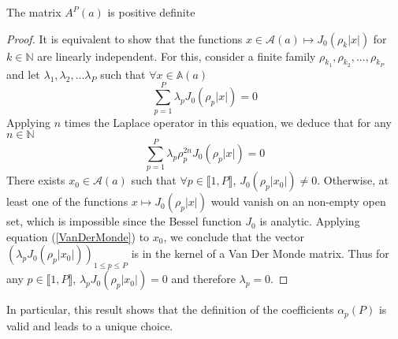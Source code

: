 \documentclass[11pt,a4paper]{article}
\begin{document}
\begin{Prop} The matrix $A^P(a)$ is positive definite
\label{AdefPos}
\begin{proof}
It is equivalent to show that the functions $x\in \mathcal{A}(a) \mapsto J_0(\rho_k |x|)$ for $k\in \mathbb{N}$ are linearly independent. For this, consider a finite family $\rho_{k_1}, \rho_{k_2}, ..., \rho_{k_P}$ and let $\lambda_1, \lambda_2, ... \lambda_P$ such that $\forall x \in \mathbb{A}(a)$ \[\sum_{p=1}^P \lambda_p J_0(\rho_p|x|) = 0 \] 
Applying $n$ times the Laplace operator in this equation, we deduce that for any $n \in \mathbb{N}$  
\begin{equation}
\sum_{p=1}^P \lambda_p \rho_p^{2n}J_0(\rho_p|x|) = 0
\label{VanDerMonde}
\end{equation}
There exists $x_0 \in \mathcal{A}(a)$ such that $\forall p\in \llbracket1,P \rrbracket$, $J_0(\rho_p |x_0|) \neq 0$. Otherwise, at least one of the functions $x \mapsto J_0(\rho_p|x|)$ would vanish on an non-empty open set, which is impossible since the Bessel function $J_0$ is analytic. Applying equation (\ref{VanDerMonde}) to $x_0$, we conclude that the vector $(\lambda_p J_0(\rho_p|x_0|))_{1\leq p \leq P}$ is in the kernel of a Van Der Monde matrix. Thus for any $p\in \llbracket 1,P\rrbracket$, $\lambda_p J_0(\rho_p |x_0|) = 0$ and therefore $\lambda_p = 0$. 
\end{proof}
\end{Prop}

In particular, this result shows that the definition of the coefficients $\alpha_p(P)$ is valid and leads to a unique choice. 
\end{document}
